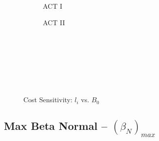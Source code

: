 \begin{figure*}[h!]
\begin{subfigure}[t]{0.45\textwidth}
\begin{adjustbox}{width=\textwidth}
      \Large
      
    \end{adjustbox}
        \caption{ACT I}
    \end{subfigure}
    \hfill
    \begin{subfigure}[t]{0.45\textwidth}
        \centering
    \begin{adjustbox}{width=\textwidth}
      \Large
      
    \end{adjustbox}
        \caption{ACT II}
    \end{subfigure}
    \hfill \hfill ~\\ ~\\ ~\\ ~\\
  \caption[]{Cost Sensitivity: $l_i$ vs. $B_0$} ~\\
\end{figure*}


\clearpage

\newpage

\subsection*{ Max Beta Normal -- $(\beta_N)_{max}$ }
  \label{subsection:sensitivity_max_beta_N}

